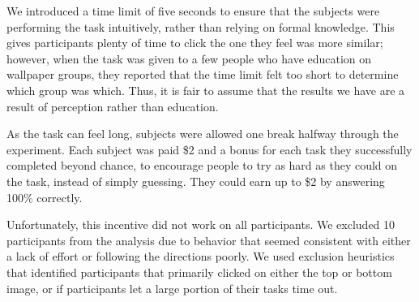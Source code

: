 We introduced a time limit of five seconds to ensure that the subjects were performing the task intuitively, rather than relying on formal knowledge. This gives participants plenty of time to click the one they feel was more similar; however, when the task was given to a few people who have education on wallpaper groups, they reported that the time limit felt too short to determine which group was which. Thus, it is fair to assume that the results we have are a result of perception rather than education.

As the task can feel long, subjects were allowed one break halfway through the experiment. Each subject was paid \$2 and a bonus for each task they successfully completed beyond chance, to encourage people to try as hard as they could on the task, instead of simply guessing. They could earn up to \$2 by answering 100\% correctly.  

Unfortunately, this incentive did not work on all participants. We excluded 10 participants from the analysis due to behavior that seemed consistent with either a lack of effort or following the directions poorly.  We used exclusion heuristics that identified participants that primarily clicked on either the top or bottom image, or if participants let a large portion of their tasks time out.






